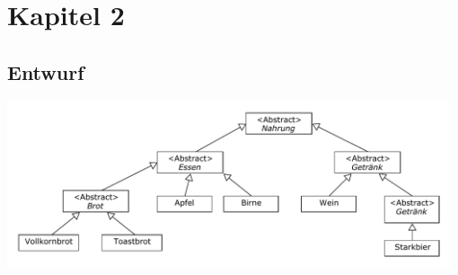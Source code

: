 \section{Kapitel 2}
\subsection{Entwurf}\begin{center}
	\includegraphics[width=0.98\textwidth]{uml/uml_c2_p3.pdf}
\end{center}